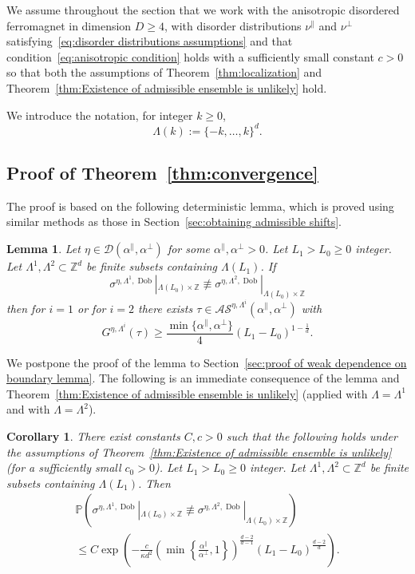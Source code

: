 \documentclass[11pt, reqno]{amsart}
\newtheorem{lemma}[theorem]{Lemma}
\newtheorem{corollary}[theorem]{Corollary}
\newcommand{\Z}{\mathbb{Z}}
\DeclareMathOperator{\Dob}{Dob}
\renewcommand{\P}{\mathbb{P}}
\numberwithin{equation}{section}
\begin{document}
We assume throughout the section that we work with the anisotropic disordered ferromagnet in dimension $D\ge 4$, with disorder distributions $\nu^\parallel$ and $\nu^\perp$ satisfying~\eqref{eq:disorder distributions assumptions} and that condition~\eqref{eq:anisotropic condition} holds with a sufficiently small constant $c>0$ so that both the assumptions of Theorem~\ref{thm:localization} and Theorem~\ref{thm:Existence of admissible ensemble is unlikely} hold.

We introduce the notation, for integer $k\ge 0$,
\begin{equation}
\Lambda(k):= \{-k,\dots, k\}^{d}.
\end{equation}

\subsection{Proof of Theorem~\ref{thm:convergence}}
The proof is based on the following deterministic lemma, which is proved using similar methods as those in Section~\ref{sec:obtaining admissible shifts}.

\begin{lemma}\label{lem:weak dependence on boundary conditions}
Let $\eta\in\mathcal{D}(\alpha^{\parallel},\alpha^{\perp})$ for some $\alpha^{\parallel},\alpha^{\perp}>0$.
Let $L_1>L_0\ge0$ integer. Let $\Lambda^1,\Lambda^2\subset\Z^d$ be finite subsets containing $\Lambda(L_1)$. 
If
\begin{equation}
\sigma^{\eta,\Lambda^1,\Dob}|_{\Lambda(L_0)\times\Z}\not\equiv \sigma^{\eta,\Lambda^2,\Dob}|_{\Lambda(L_0)\times\Z}
\end{equation}
then for $i=1$ or for $i=2$ there exists ${\tau}\in \mathcal{AS}^{\eta,\Lambda^i}(\alpha^{\parallel},\alpha^{\perp})$ with
\begin{equation}
G^{\eta,\Lambda^i}({\tau})\geq \frac{\min \{\alpha^{\parallel},\alpha^{\perp}\}}{4} (L_1-L_0) ^{1-\frac{1}{d}}.
\end{equation} 
\end{lemma}
We postpone the proof of the lemma to Section~\ref{sec:proof of weak dependence on boundary lemma}. The following is an immediate consequence of the lemma and Theorem~\ref{thm:Existence of admissible ensemble is unlikely} (applied with $\Lambda=\Lambda^1$ and with $\Lambda=\Lambda^2$).

\begin{corollary}\label{cor:weak dependence on domain}
There exist constants $C,c>0$ such that the following holds under the assumptions of Theorem~\ref{thm:Existence of admissible ensemble is unlikely} (for a sufficiently small $c_0>0$). Let $L_1>L_0\ge0$ integer. Let $\Lambda^1,\Lambda^2\subset\Z^d$ be finite subsets containing $\Lambda(L_1)$. 
Then
\begin{multline}
\P\left(\sigma^{\eta,\Lambda^1,\Dob}|_{\Lambda(L_0)\times\Z}\not\equiv \sigma^{\eta,\Lambda^2,\Dob}|_{\Lambda(L_0)\times\Z}\right)\\\le C\exp \left(-\frac{c}{\kappa  d^2} \left( \min \left\{\frac{\alpha^{\parallel}}{\alpha^{\perp}},1\right\}\right)^{\frac{d-2}{d-1}}\left(L_1 - L_0\right)^{\frac{d-2}{d}} \right).
\end{multline} 
\end{corollary}
\end{document}
